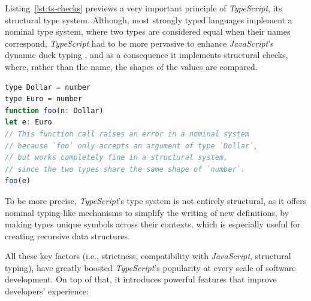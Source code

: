 Listing~\ref{lst:ts-checks} previews a very important principle of \textit{TypeScript},
its structural type system. Although, most strongly typed languages implement a nominal type system,
where two types are considered equal when their names correspond,
\textit{TypeScript} had to be more pervasive to enhance
\textit{JavaScript}'s dynamic duck typing \cite{duck-typing},
and as a consequence it implements structural checks, where, rather than the name,
the shapes of the values are compared.

\begin{lstlisting}[language=javascript]
type Dollar = number
type Euro = number
function foo(n: Dollar)
let e: Euro
// This function call raises an error in a nominal system
// because `foo` only accepts an argument of type `Dollar`,
// but works completely fine in a structural system,
// since the two types share the same shape of `number`.
foo(e)
\end{lstlisting}

To be more precise, \textit{TypeScript}'s type system is not entirely structural,
as it offers nominal typing-like mechanisms to simplify the writing of new definitions,
by making types unique symbols across their contexts, which is especially useful for
creating recursive data structures.

All these key factors (i.e., strictness, compatibility with \textit{JavaScript}, structural typing),
have greatly boosted \textit{TypeScript}'s popularity at every scale of software development.
On top of that, it introduces powerful features that improve developers' experience:

